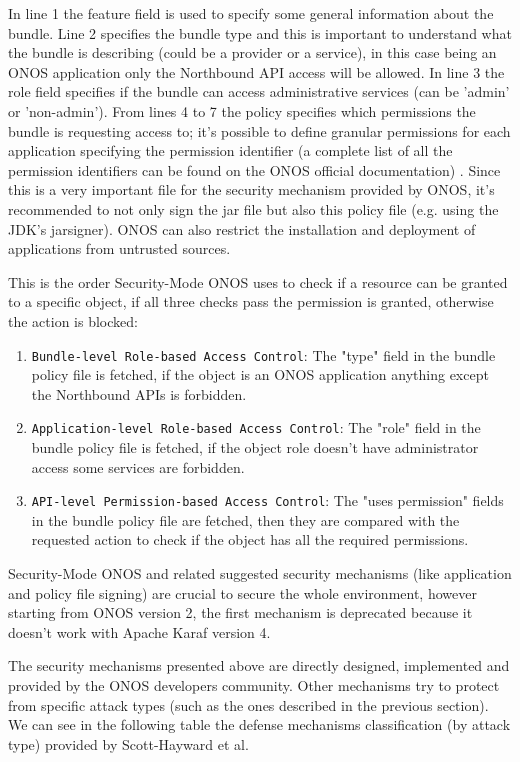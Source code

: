 In line 1 the feature field is used to specify some general information about the bundle. Line 2 specifies the bundle type and this is important to understand what the bundle is describing (could be a provider or a service), in this case being an ONOS application only the Northbound API access will be allowed. In line 3 the role field specifies if the bundle can access administrative services (can be 'admin' or 'non-admin'). From lines 4 to 7 the policy specifies which permissions the bundle is requesting access to; it's possible to define granular permissions for each application specifying the permission identifier (a complete list of all the permission identifiers can be found on the ONOS official documentation) \cite{secmode-perms}. Since this is a very important file for the security mechanism provided by ONOS, it's recommended to not only sign the jar file but also this policy file (e.g. using the JDK’s jarsigner). ONOS can also restrict the installation and deployment of applications from untrusted sources.

This is the order Security-Mode ONOS uses to check if a resource can be granted to a specific object, if all three checks pass the permission is granted, otherwise the action is blocked:
\begin{enumerate}
  \item\texttt{Bundle-level Role-based Access Control}: The "type" field in the bundle policy file is fetched, if the object is an ONOS application anything except the Northbound APIs is forbidden.
  \item\texttt{Application-level Role-based Access Control}: The "role" field in the bundle policy file is fetched, if the object role doesn't have administrator access some services are forbidden. 
  \item\texttt{API-level Permission-based Access Control}: The "uses permission" fields in the bundle policy file are fetched, then they are compared with the requested action to check if the object has all the required permissions. 
\end{enumerate}

Security-Mode ONOS and related suggested security mechanisms (like application and policy file signing) are crucial to secure the whole environment, however starting from ONOS version 2, the first mechanism is deprecated because it doesn't work with Apache Karaf version 4. 

The security mechanisms presented above are directly designed, implemented and provided by the ONOS developers community. Other mechanisms try to protect from specific attack types (such as the ones described in the previous section). We can see in the following table the defense mechanisms classification (by attack type) provided by Scott-Hayward et al.

